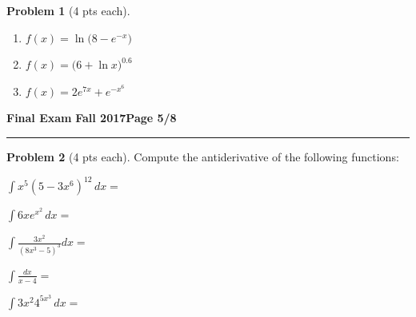 \documentclass[12pt]{article}
\theoremstyle{definition}
\newtheorem{problem}{Problem}
\begin{document}
\begin{problem}[4 pts each]
\begin{enumerate}
\item $f(x) = \ln \big(8 - e^{-x}\big)$
\begin{flushright}
\end{flushright}
\item $f(x) = \big( 6 + \ln x \big)^{0.6}$
\begin{flushright}
\end{flushright}
\item $f(x) = 2e^{7x} + e^{-x^6}$
\begin{flushright}
\end{flushright}
\end{enumerate}
\end{problem}

\newpage

\hfill{\large\bf Final Exam}\hfill{\large\bf
  Fall 2017}\hfill{\large\bf Page 5/8}\hrule

\bigskip 

\begin{problem}[4 pts each]
Compute the antiderivative of the following functions:
\item $\displaystyle{\int x^5 (5 - 3x^6)^{12}\, dx =}$
\vspace{2cm}
\item $\displaystyle{\int  6xe^{x^2} \, dx =}$
\vspace{2cm}
\item $\displaystyle{\int \frac{3x^2}{(8x^3-5)^3} dx =}$
\vspace{4cm}
\item $\displaystyle{\int \frac{dx}{x-4} =}$
\vspace{4cm}
\item $\displaystyle{\int 3x^2 4^{5x^3}\, dx =}$
\end{problem}

\newpage
\end{document}
